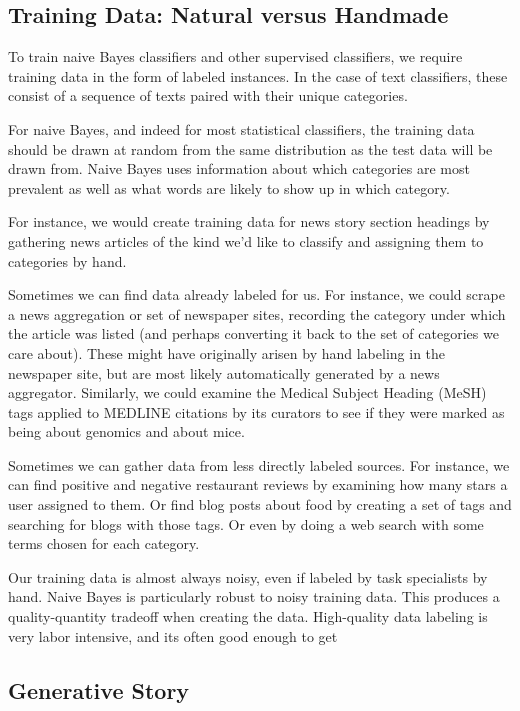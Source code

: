 \subsection{Training Data: Natural versus Handmade}

To train naive Bayes classifiers and other supervised classifiers, we
require training data in the form of labeled instances.  In the case
of text classifiers, these consist of a sequence of texts paired with
their unique categories.  

For naive Bayes, and indeed for most statistical classifiers, the
training data should be drawn at random from the same distribution as
the test data will be drawn from.  Naive Bayes uses information about
which categories are most prevalent as well as what words are likely
to show up in which category.

For instance, we would create training data for news story section
headings by gathering news articles of the kind we'd like to classify
and assigning them to categories by hand. 

Sometimes we can find data already labeled for us.  For instance, we
could scrape a news aggregation or set of newspaper sites, recording
the category under which the article was listed (and perhaps
converting it back to the set of categories we care about).  These
might have originally arisen by hand labeling in the newspaper site,
but are most likely automatically generated by a news aggregator.
Similarly, we could examine the Medical Subject Heading (MeSH) tags
applied to MEDLINE citations by its curators to see if they were
marked as being about genomics and about mice.  

Sometimes we can gather data from less directly labeled sources.  For
instance, we can find positive and negative restaurant reviews by
examining how many stars a user assigned to them.  Or find blog posts
about food by creating a set of tags and searching for blogs with
those tags.  Or even by doing a web search with some terms chosen
for each category.

Our training data is almost always noisy, even if labeled by task
specialists by hand.  Naive Bayes is particularly robust to noisy
training data.  This produces a quality-quantity tradeoff when
creating the data.  High-quality data labeling is very labor
intensive, and its often good enough to get



\subsection{Generative Story}

